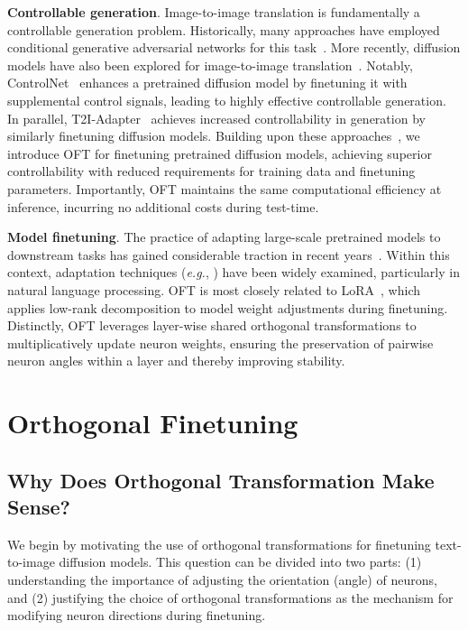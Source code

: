 \textbf{Controllable generation}. Image-to-image translation is fundamentally a controllable generation problem. Historically, many approaches have employed conditional generative adversarial networks for this task~\cite{isola2017image,zhu2017toward,wang2018high,park2019semantic,choi2018stargan}. More recently, diffusion models have also been explored for image-to-image translation~\cite{saharia2022palette,voynov2022sketch,wang2022pretraining}. Notably, ControlNet~\cite{zhang2023adding} enhances a pretrained diffusion model by finetuning it with supplemental control signals, leading to highly effective controllable generation. In parallel, T2I-Adapter~\cite{mou2023t2i} achieves increased controllability in generation by similarly finetuning diffusion models. Building upon these approaches~\cite{zhang2023adding,mou2023t2i}, we introduce OFT for finetuning pretrained diffusion models, achieving superior controllability with reduced requirements for training data and finetuning parameters. Importantly, OFT maintains the same computational efficiency at inference, incurring no additional costs during test-time.

\textbf{Model finetuning}. The practice of adapting large-scale pretrained models to downstream tasks has gained considerable traction in recent years~\cite{devlin2018bert,brown2020language,he2022masked}. Within this context, adaptation techniques (\emph{e.g.}, \cite{hulora2022,houlsby2019parameter,pfeiffer2020adapterfusion}) have been widely examined, particularly in natural language processing. OFT is most closely related to LoRA~\cite{hulora2022}, which applies low-rank decomposition to model weight adjustments during finetuning. Distinctly, OFT leverages layer-wise shared orthogonal transformations to multiplicatively update neuron weights, ensuring the preservation of pairwise neuron angles within a layer and thereby improving stability.

\section{Orthogonal Finetuning}

\subsection{Why Does Orthogonal Transformation Make Sense?}

We begin by motivating the use of orthogonal transformations for finetuning text-to-image diffusion models. This question can be divided into two parts: (1) understanding the importance of adjusting the orientation (angle) of neurons, and (2) justifying the choice of orthogonal transformations as the mechanism for modifying neuron directions during finetuning.

